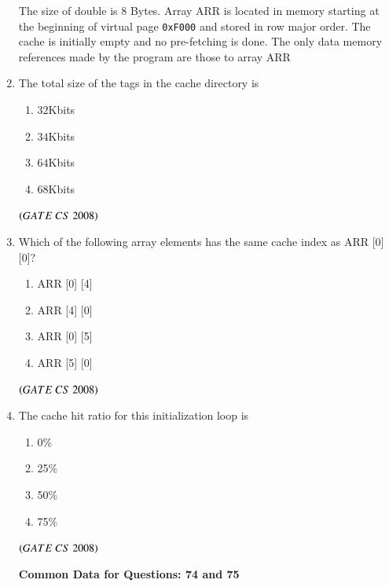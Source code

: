 \documentclass[journal, onecolumn]{IEEEtran}
\numberwithin{equation}{enumi}
\numberwithin{figure}{enumi}
\begin{document}
\begin{enumerate}
The size of double is $8$ Bytes.  
Array ARR is located in memory starting at the beginning of virtual page \texttt{0xF000}  
and stored in row major order.  
The cache is initially empty and no pre-fetching is done.  
The only data memory references made by the program are those to array ARR \\
\item The total size of the tags in the cache directory is
\vspace{-1em}%
\begin{multicols}{4}
\begin{enumerate}
   \item $32$Kbits 
   \item $34$Kbits 
   \item $64$Kbits
   \item $68$Kbits 
\end{enumerate}
\end{multicols}
\hfill $\left(GATE\ CS\  2008\right)$

\item Which of the following array elements has the same cache index as ARR [0] [0]?
\vspace{-1em}%
\begin{multicols}{4}
\begin{enumerate}
   \item  ARR [0] [4] 
   \item  ARR [4] [0]
   \item  ARR [0] [5] 
   \item  ARR [5] [0] 
\end{enumerate}
\end{multicols}
\hfill $\left(GATE\ CS\  2008\right)$

\item The cache hit ratio for this initialization loop is
\vspace{-1em}%
\begin{multicols}{4}
\begin{enumerate}
   \item 0\%  
   \item 25\%  
   \item 50\%  
   \item 75\%  
\end{enumerate}
\end{multicols}
\hfill $\left(GATE\ CS\  2008\right)$

\begin{center}
\textbf{ Common Data for Questions: 74 and 75}
\end{center}


\end{enumerate}
\end{document}
